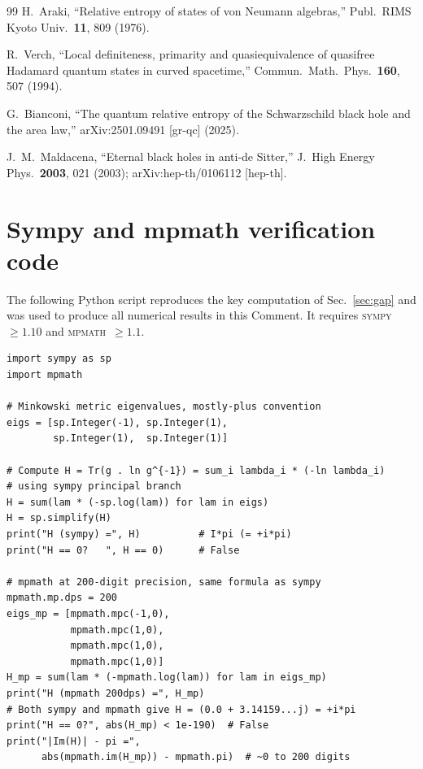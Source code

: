 \documentclass[aps,prd,twocolumn,preprintnumbers,superscriptaddress]{revtex4-2}
\begin{document}
\begin{thebibliography}{99}
H.~Araki,
``Relative entropy of states of von Neumann algebras,''
Publ.\ RIMS Kyoto Univ.\ \textbf{11}, 809 (1976).

R.~Verch,
``Local definiteness, primarity and quasiequivalence of quasifree Hadamard
quantum states in curved spacetime,''
Commun.\ Math.\ Phys.\ \textbf{160}, 507 (1994).

G.~Bianconi,
``The quantum relative entropy of the Schwarzschild black hole and the area law,''
arXiv:2501.09491 [gr-qc] (2025).

J.~M.~Maldacena,
``Eternal black holes in anti-de Sitter,''
J.\ High Energy Phys.\ \textbf{2003}, 021 (2003);
arXiv:hep-th/0106112 [hep-th].

\end{thebibliography}

\appendix

\section{Sympy and mpmath verification code}
\label{app:code}

The following Python script reproduces the key computation of
Sec.~\ref{sec:gap} and was used to produce all numerical results
in this Comment.  It requires \textsc{sympy}~$\geq 1.10$ and
\textsc{mpmath}~$\geq 1.1$.

\begin{lstlisting}[caption={Lorentzian signature gap verification
(\texttt{sympy\_lorentzian.py})}]
import sympy as sp
import mpmath

# Minkowski metric eigenvalues, mostly-plus convention
eigs = [sp.Integer(-1), sp.Integer(1),
        sp.Integer(1),  sp.Integer(1)]

# Compute H = Tr(g . ln g^{-1}) = sum_i lambda_i * (-ln lambda_i)
# using sympy principal branch
H = sum(lam * (-sp.log(lam)) for lam in eigs)
H = sp.simplify(H)
print("H (sympy) =", H)          # I*pi (= +i*pi)
print("H == 0?   ", H == 0)      # False

# mpmath at 200-digit precision, same formula as sympy
mpmath.mp.dps = 200
eigs_mp = [mpmath.mpc(-1,0),
           mpmath.mpc(1,0),
           mpmath.mpc(1,0),
           mpmath.mpc(1,0)]
H_mp = sum(lam * (-mpmath.log(lam)) for lam in eigs_mp)
print("H (mpmath 200dps) =", H_mp)
# Both sympy and mpmath give H = (0.0 + 3.14159...j) = +i*pi
print("H == 0?", abs(H_mp) < 1e-190)  # False
print("|Im(H)| - pi =",
      abs(mpmath.im(H_mp)) - mpmath.pi)  # ~0 to 200 digits
\end{lstlisting}
\end{document}

